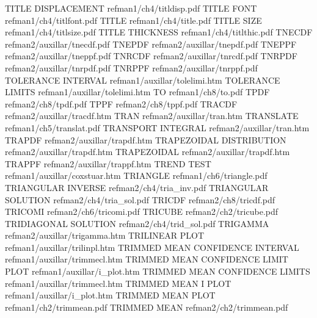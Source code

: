TITLE DISPLACEMENT                      refman1/ch4/titldisp.pdf
TITLE FONT                              refman1/ch4/titlfont.pdf
TITLE                                   refman1/ch4/title.pdf
TITLE SIZE                              refman1/ch4/titlsize.pdf
TITLE THICKNESS                         refman1/ch4/titlthic.pdf
TNECDF                                  refman2/auxillar/tnecdf.pdf
TNEPDF                                  refman2/auxillar/tnepdf.pdf
TNEPPF                                  refman2/auxillar/tneppf.pdf
TNRCDF                                  refman2/auxillar/tnrcdf.pdf
TNRPDF                                  refman2/auxillar/tnrpdf.pdf
TNRPPF                                  refman2/auxillar/tnrppf.pdf
TOLERANCE INTERVAL                      refman1/auxillar/tolelimi.htm
TOLERANCE LIMITS                        refman1/auxillar/tolelimi.htm
TO                                      refman1/ch8/to.pdf
TPDF                                    refman2/ch8/tpdf.pdf
TPPF                                    refman2/ch8/tppf.pdf
TRACDF                                  refman2/auxillar/tracdf.htm
TRAN                                    refman2/auxillar/tran.htm
TRANSLATE                               refman1/ch5/translat.pdf
TRANSPORT INTEGRAL                      refman2/auxillar/tran.htm
TRAPDF                                  refman2/auxillar/trapdf.htm
TRAPEZOIDAL DISTRIBUTION                refman2/auxillar/trapdf.htm
TRAPEZOIDAL                             refman2/auxillar/trapdf.htm
TRAPPF                                  refman2/auxillar/trappf.htm
TREND TEST                              refman1/auxillar/coxstuar.htm
TRIANGLE                                refman1/ch6/triangle.pdf
TRIANGULAR INVERSE                      refman2/ch4/tria_inv.pdf
TRIANGULAR SOLUTION                     refman2/ch4/tria_sol.pdf
TRICDF                                  refman2/ch8/tricdf.pdf
TRICOMI                                 refman2/ch6/tricomi.pdf
TRICUBE                                 refman2/ch2/tricube.pdf
TRIDIAGONAL SOLUTION                    refman2/ch4/trid_sol.pdf
TRIGAMMA                                refman2/auxillar/trigamma.htm
TRILINEAR PLOT                          refman1/auxillar/trilinpl.htm
TRIMMED MEAN CONFIDENCE INTERVAL        refman1/auxillar/trimmecl.htm
TRIMMED MEAN CONFIDENCE LIMIT PLOT      refman1/auxillar/i_plot.htm
TRIMMED MEAN CONFIDENCE LIMITS          refman1/auxillar/trimmecl.htm
TRIMMED MEAN I PLOT                     refman1/auxillar/i_plot.htm
TRIMMED MEAN PLOT                       refman1/ch2/trimmean.pdf
TRIMMED MEAN                            refman2/ch2/trimmean.pdf
